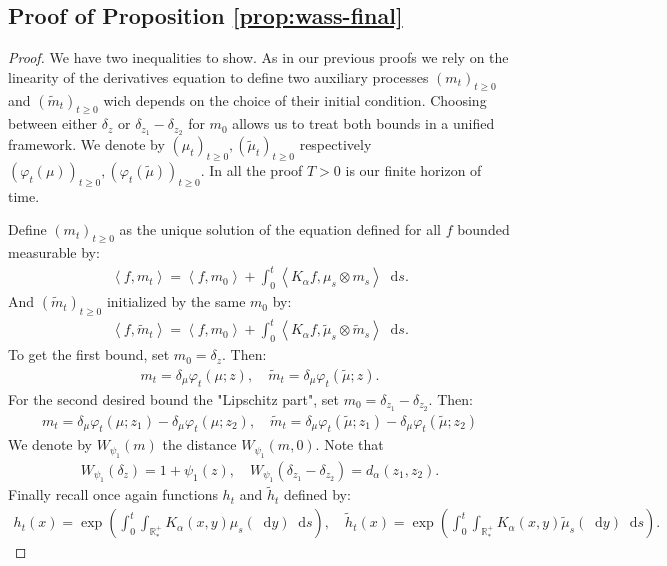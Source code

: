 \documentclass[11pt,a4paper]{article}
\newcommand{\RRP}{\mathbb{R}^+_*}
\newcommand{\Proc}[1]{\left(#1\right)_{t\geq 0}}
\newcommand{\brac}[1]{\left\langle#1\right\rangle}
\newcommand{\dd}{\mathop{}\!\mathrm{d}}
\begin{document}
\subsection{Proof of Proposition \ref{prop:wass-final}} 
\begin{proof}
    We have two inequalities to show. As in our previous proofs we rely on the linearity of the derivatives equation to define two auxiliary processes $\Proc{m_t}$ and $\Proc{\tilde{m}_t}$ wich depends on the choice of their initial condition. Choosing between either $\delta_z$ or $\delta_{z_1}-\delta_{z_2}$ for $m_0$ allows us to treat both bounds in a unified framework. We denote by $\Proc{\mu_t},\Proc{\tilde{\mu}_t}$ respectively $\Proc{\varphi_t(\mu)},\Proc{\varphi_t(\tilde{\mu})}$. In all the proof $T> 0$ is our finite horizon of time.
    
    
    Define $\Proc{m_t}$ as the unique solution of the equation defined for all $f$  bounded measurable by:
    \begin{align*}
        \brac{f,m_t} = \brac{f,m_0} + \int_0^t \brac{K_\alpha f,\mu_s\otimes m_s} \dd s.
    \end{align*}
    And $\Proc{\tilde{m}_t}$ initialized by the same $m_0$ by:
    \begin{align*}
        \brac{f,\tilde{m}_t} = \brac{f,m_0} + \int_0^t \brac{K_\alpha f,\tilde{\mu}_s\otimes \tilde{m}_s} \dd s.
    \end{align*}
    To get the first bound, set $m_0 = \delta_z$. Then:
    \begin{align*}
        m_t = \delta_\mu \varphi_t(\mu;z) , \quad \tilde{m}_t = \delta_\mu \varphi_t(\tilde{\mu};z).
    \end{align*}
    For the second desired bound the "Lipschitz part", set $m_0 = \delta_{z_1} - \delta_{z_2}$. Then:
    \begin{align*}
        m_t = \delta_\mu \varphi_t(\mu;z_1) - \delta_\mu \varphi_t(\mu;z_2), \quad \tilde{m}_t = \delta_\mu \varphi_t(\tilde{\mu};z_1) - \delta_\mu \varphi_t(\tilde{\mu};z_2)
    \end{align*}
    We denote by $W_{\psi_1}(m)$ the distance $W_{\psi_1}(m,0)$. Note that 
    \begin{align*}
        W_{\psi_1}(\delta_z) = 1 + \psi_1(z) ,\quad W_{\psi_1}\left( \delta_{z_1} - \delta_{z_2}\right) = d_{\alpha}(z_1,z_2).
    \end{align*}
    Finally recall once again functions $h_t$ and $\tilde{h}_t$ defined by:
    \begin{align*}
        h_t(x) = \exp\left(\int_0^t \int_{\RRP} K_\alpha(x,y) \mu_s(\dd y)\dd s \right), \quad \tilde{h}_t(x) = \exp\left(\int_0^t \int_{\RRP} K_\alpha(x,y) \tilde{\mu}_s(\dd y)\dd s \right).

\end{align*}
\end{proof}
\end{document}
